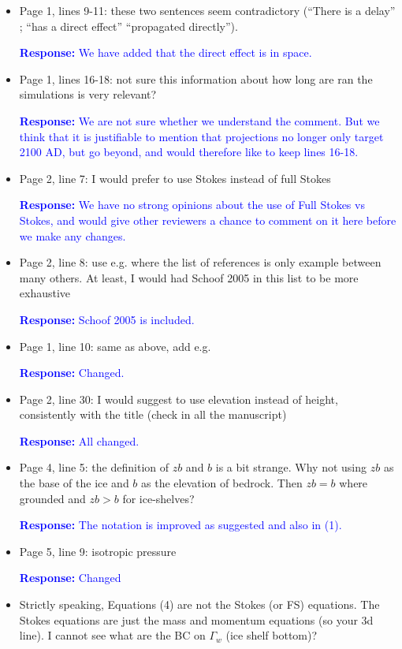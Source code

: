 \documentclass{article}
\newcommand{\colorthree}{blue}
\newcommand{\revth}[1]{\noindent \textcolor{\colorthree}{{\bf Response:} #1}}
\begin{document}
\begin{itemize}
\item Page 1, lines 9-11: these two sentences seem contradictory (“There is a delay” ; “has a direct effect” “propagated directly”). 

\revth{We have added that the direct effect is in space.}

\item Page 1, lines 16-18: not sure this information about how long are ran the simulations is very relevant?

\revth{We are not sure whether we understand the comment. But we think that it is justifiable to mention that projections no longer only target 2100 AD, but go beyond, and would therefore like to keep lines 16-18.}




\item Page 2, line 7: I would prefer to use Stokes instead of full Stokes

\revth{We have no strong opinions about the use of Full Stokes vs Stokes, and would give other reviewers a chance to comment on it here before we make any changes.}

\item Page 2, line 8: use e.g. where the list of references is only example between many others. At least, I would had Schoof 2005 in this list to be more exhaustive

\revth{Schoof 2005 is included.}

\item Page 1, line 10: same as above, add e.g.

\revth{Changed.}

\item Page 2, line 30: I would suggest to use elevation instead of height, consistently with the title (check in all the manuscript)

\revth{All changed.}

\item Page 4, line 5: the definition of $zb$ and $b$ is a bit strange. Why not using $zb$ as the base of the ice and $b$ as the elevation of bedrock. Then $zb=b$ where grounded and $zb>b$ for ice-shelves?

\revth{The notation is improved as suggested and also in (1).}

\item Page 5, line 9: isotropic pressure

\revth{Changed}

\item Strictly speaking, Equations (4) are not the Stokes (or FS) equations. The Stokes equations are just the mass and momentum equations (so your 3d line). I cannot see what are the BC on $\Gamma_w$ (ice shelf bottom)?


\end{itemize}
\end{document}
